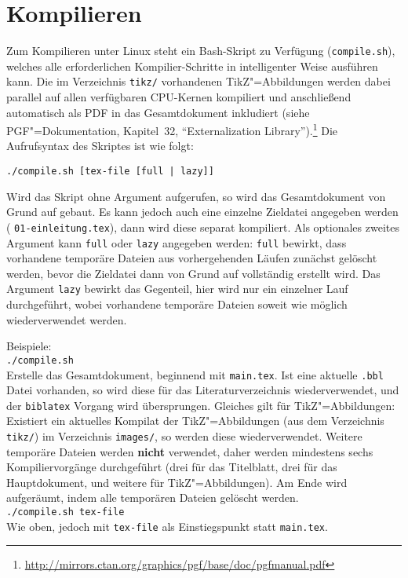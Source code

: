\section{Kompilieren}\label{sec:kompilieren}
%
Zum Kompilieren unter Linux steht ein Bash-Skript zu Verfügung (\texttt{compile.sh}), welches alle erforderlichen Kompilier-Schritte in intelligenter Weise ausführen kann. Die im Verzeichnis \texttt{tikz/} vorhandenen TikZ"=Abbildungen werden dabei parallel auf allen verfügbaren CPU-Kernen kompiliert und anschließend automatisch als PDF in das Gesamtdokument inkludiert (siehe PGF"=Dokumentation, Kapitel~32, \enquote{Externalization Library}).\footnote{\url{http://mirrors.ctan.org/graphics/pgf/base/doc/pgfmanual.pdf}} Die Aufrufsyntax des Skriptes ist wie folgt:
%
\begin{center}
  \texttt{./compile.sh [tex-file [full | lazy]]}
\end{center}
%
Wird das Skript ohne Argument aufgerufen, so wird das Gesamtdokument von Grund auf gebaut. Es kann jedoch auch eine einzelne Zieldatei angegeben werden (\zB{} \texttt{01-einleitung.tex}), dann wird diese separat kompiliert. Als optionales zweites Argument kann \texttt{full} oder \texttt{lazy} angegeben werden: \texttt{full} bewirkt, dass \ggf{} vorhandene temporäre Dateien aus vorhergehenden Läufen zunächst gelöscht werden, bevor die Zieldatei dann von Grund auf vollständig erstellt wird. Das Argument \texttt{lazy} bewirkt das Gegenteil, hier wird nur ein einzelner Lauf durchgeführt, wobei vorhandene temporäre Dateien soweit wie möglich wiederverwendet werden.
%
\\\par\noindent Beispiele:\\[1em]
%
\texttt{./compile.sh}\\Erstelle das Gesamtdokument, beginnend mit \texttt{main.tex}. Ist eine aktuelle \texttt{.bbl} Datei vorhanden, so wird diese für das Literaturverzeichnis wiederverwendet, und der \texttt{biblatex} Vorgang wird übersprungen. Gleiches gilt für TikZ"=Abbildungen: Existiert ein aktuelles Kompilat der TikZ"=Abbildungen (aus dem Verzeichnis \texttt{tikz/}) im Verzeichnis \texttt{images/}, so werden diese wiederverwendet. Weitere temporäre Dateien werden \textbf{nicht} verwendet, daher werden mindestens sechs Kompiliervorgänge durchgeführt (drei für das Titelblatt, drei für das Hauptdokument, und \ggf{} weitere für TikZ"=Abbildungen). Am Ende wird aufgeräumt, indem alle temporären Dateien gelöscht werden.\\[1em]
%
\texttt{./compile.sh tex-file}\\Wie oben, jedoch mit \texttt{tex-file} als Einstiegspunkt statt \texttt{main.tex}.\\[1em]
